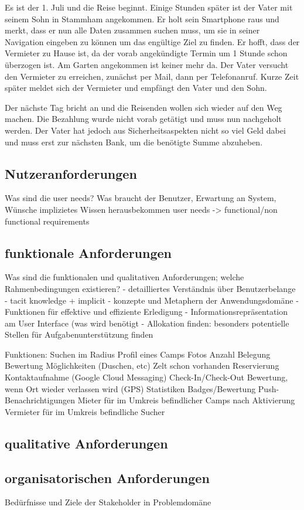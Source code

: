 Es ist der 1. Juli und die Reise beginnt. Einige Stunden später ist der Vater mit seinem Sohn in Stammham angekommen. Er holt sein Smartphone raus und merkt, dass er nun alle Daten zusammen suchen muss, um sie in seiner Navigation eingeben zu können um das engültige Ziel zu finden. Er hofft, dass der Vermieter zu Hause ist, da der vorab angekündigte Termin um 1 Stunde schon überzogen ist. Am Garten angekommen ist keiner mehr da. Der Vater versucht den Vermieter zu erreichen, zunächst per Mail, dann per Telefonanruf. Kurze Zeit später meldet sich der Vermieter und empfängt den Vater und den Sohn.

Der nächste Tag bricht an und die Reisenden wollen sich wieder auf den Weg machen. Die Bezahlung wurde nicht vorab getätigt und muss nun nachgeholt werden. Der Vater hat jedoch aus Sicherheitsaspekten nicht so viel Geld dabei und muss erst zur nächsten Bank, um die benötigte Summe abzuheben.

\subsection{Nutzeranforderungen}
Was sind die user needs?
        	Was braucht der Benutzer, Erwartung an System, Wünsche
        	implizietes Wissen herausbekommen
        	user needs -> functional/non functional requirements

        	

\subsection{funktionale Anforderungen}        	
Was sind die funktionalen und qualitativen Anforderungen; welche Rahmenbedingungen existieren?
- detailliertes Verständnis über Benutzerbelange
- tacit knowledge + implicit
- konzepte und Metaphern der Anwendungsdomäne
- Funktionen für effektive und effiziente Erledigung
- Informationsrepräsentation am User Interface (was wird benötigt
- Allokation finden: besonders potentielle Stellen für Aufgabenunterstützung finden


Funktionen:
Suchen im Radius
Profil eines Camps
Fotos
Anzahl
Belegung
Bewertung
Möglichkeiten (Duschen, etc)
Zelt schon vorhanden
Reservierung
Kontaktaufnahme (Google Cloud Messaging)
Check-In/Check-Out
Bewertung, wenn Ort wieder verlassen wird (GPS)
Statistiken
Badges/Bewertung
Push-Benachrichtigungen
Mieter
für im Umkreis befindlicher Camps nach Aktivierung
Vermieter
für im Umkreis befindliche Sucher



\subsection{qualitative Anforderungen}   

\subsection{organisatorischen Anforderungen}        	
 
Bedürfnisse und Ziele der Stakeholder in Problemdomäne
 

